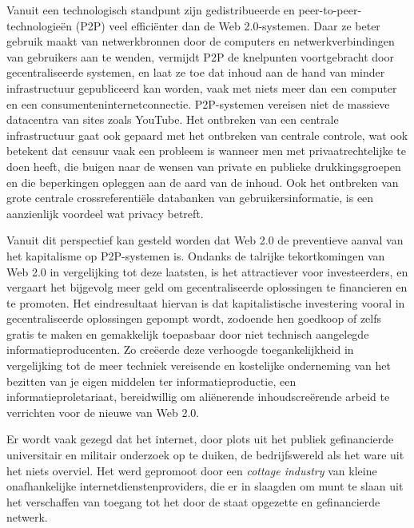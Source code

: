 {Vanuit een technologisch standpunt zijn gedistribueerde en
peer{}-to{}-peer{}-technologie\"en (P2P) veel effici\"enter dan de Web
2.0{}-systemen. Daar ze beter gebruik maakt van netwerkbronnen door de
computers en netwerkverbindingen van gebruikers aan te wenden, vermijdt
P2P de knelpunten voortgebracht door gecentraliseerde systemen, en laat
ze toe dat inhoud aan de hand van minder infrastructuur gepubliceerd
kan worden, vaak met niets meer dan een computer en een
consumenteninternetconnectie. P2P{}-systemen vereisen niet de massieve
datacentra van sites zoals YouTube. Het ontbreken van een centrale
infrastructuur gaat ook gepaard met het ontbreken van centrale
controle, wat ook betekent dat censuur vaak een probleem is wanneer men
met privaatrechtelijke  te doen heeft, die buigen naar de
wensen van private en publieke drukkingsgroepen en die beperkingen
opleggen aan de aard van de inhoud. Ook het ontbreken van grote
centrale crossreferenti\"ele databanken van gebruikersinformatie, is
een aanzienlijk voordeel wat privacy betreft. 

Vanuit dit perspectief kan gesteld worden dat Web 2.0 de preventieve
aanval van het kapitalisme op P2P{}-systemen is. Ondanks de talrijke
tekortkomingen van Web 2.0 in vergelijking tot deze laatsten, is het
attractiever voor investeerders, en vergaart het bijgevolg meer geld om
gecentraliseerde oplossingen te financieren en te promoten. Het
eindresultaat hiervan is dat kapitalistische investering vooral in
gecentraliseerde oplossingen gepompt wordt, zodoende hen goedkoop of
zelfs gratis te maken en gemakkelijk toepasbaar door niet technisch
aangelegde informatieproducenten. Zo cre\"eerde deze verhoogde
toegankelijkheid in vergelijking tot de meer techniek vereisende en
kostelijke onderneming van het bezitten van je eigen middelen ter
informatieproductie, een  informatieproletariaat,
bereidwillig om ali\"enerende inhoudscre\"erende arbeid te verrichten
voor de nieuwe  van Web 2.0.

Er wordt vaak gezegd dat het internet, door plots uit het publiek
gefinancierde universitair en militair onderzoek op te duiken, de
bedrijfswereld als het ware uit het niets overviel. Het werd gepromoot
door een {\em cottage industry} van kleine onafhankelijke
internetdienstenproviders, die er in slaagden om munt te slaan uit het
verschaffen van toegang tot het door de staat opgezette en
gefinancierde netwerk. 

}
